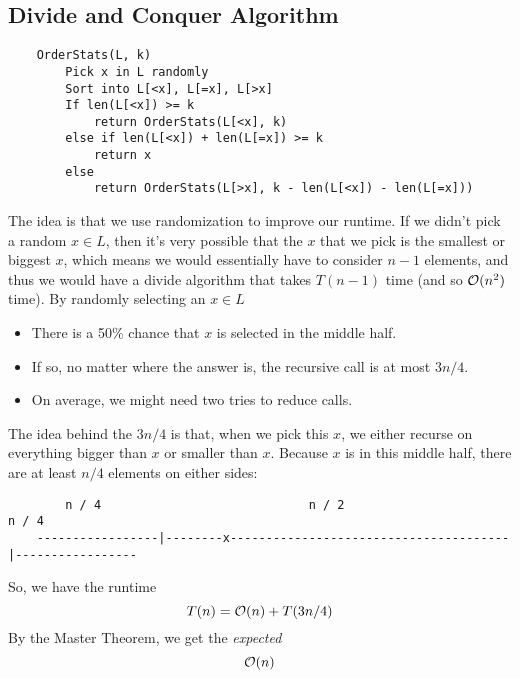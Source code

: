 \documentclass[letterpaper]{article}
\begin{document}
\subsection{Divide and Conquer Algorithm}
\begin{verbatim}
    OrderStats(L, k)
        Pick x in L randomly 
        Sort into L[<x], L[=x], L[>x]
        If len(L[<x]) >= k
            return OrderStats(L[<x], k)
        else if len(L[<x]) + len(L[=x]) >= k
            return x 
        else 
            return OrderStats(L[>x], k - len(L[<x]) - len(L[=x]))
\end{verbatim}
The idea is that we use randomization to improve our runtime. If we didn't pick a random $x \in L$, then it's very possible that the $x$ that we pick is the smallest or biggest $x$, which means we would essentially have to consider $n - 1$ elements, and thus we would have a divide algorithm that takes $T(n - 1)$ time (and so $\mathcal{O}(n^2)$ time). By randomly selecting an $x \in L$
\begin{itemize}
    \item There is a 50\% chance that $x$ is selected in the middle half. 
    \item If so, no matter where the answer is, the recursive call is at most $3n / 4$. 
    \item On average, we might need two tries to reduce calls. 
\end{itemize}
The idea behind the $3n / 4$ is that, when we pick this $x$, we either recurse on everything bigger than $x$ or smaller than $x$. Because $x$ is in this middle half, there are at least $n / 4$ elements on either sides: 
\begin{verbatim}
        n / 4                             n / 2                                 n / 4  
    -----------------|--------x---------------------------------------|-----------------
\end{verbatim}
So, we have the runtime 
\[T(n) = \mathcal{O}(n) + T(3n / 4)\]
By the Master Theorem, we get the \emph{expected}  
\[\mathcal{O}(n)\]
\end{document}
